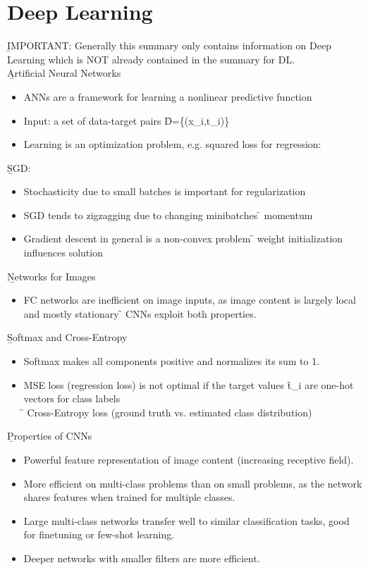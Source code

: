 \section{Deep Learning}
\b{IMPORTANT:} Generally this summary only contains information on Deep Learning which is NOT already contained in the summary for DL.\\

\b{Artificial Neural Networks}
\begin{itemize}
    \item ANNs are a framework for learning a nonlinear predictive function
    \item Input: a set of data-target pairs \f{D=\{(x_i,t_i)\}}
    \item Learning is an optimization problem, e.g. squared loss for regression:
\end{itemize}
\b{SGD:}
\begin{itemize}
    \item Stochasticity due to small batches is important for regularization
    \item SGD tends to zigzagging due to changing minibatches \f{\to} momentum
    \item Gradient descent in general is a non-convex problem \f{\to} weight initialization influences solution
\end{itemize}
\vspace{0.5em}
\b{Networks for Images}
\begin{itemize}
    \item FC networks are inefficient on image inputs, as image content is largely local and mostly stationary \f{\to} CNNs exploit both properties.
\end{itemize}
\vspace{0.5em}
\b{Softmax and Cross-Entropy}
\begin{itemize}
    \item Softmax makes all components positive and normalizes its sum to 1.
    \item MSE loss (regression loss) is not optimal if the target values \f{t_i} are one-hot vectors for class labels\\
    \f{\to} Cross-Entropy loss (ground truth vs. estimated class distribution)
\end{itemize}
\vspace{0.5em}
\b{Properties of CNNs}
\begin{itemize}
    \item Powerful feature representation of image content (increasing receptive field).
    \item More efficient on multi-class problems than on small problems, as the network shares features when trained for multiple classes.
    \item Large multi-class networks transfer well to similar classification tasks, good for finetuning or few-shot learning.
    \item Deeper networks with smaller filters are more efficient.
\end{itemize}
